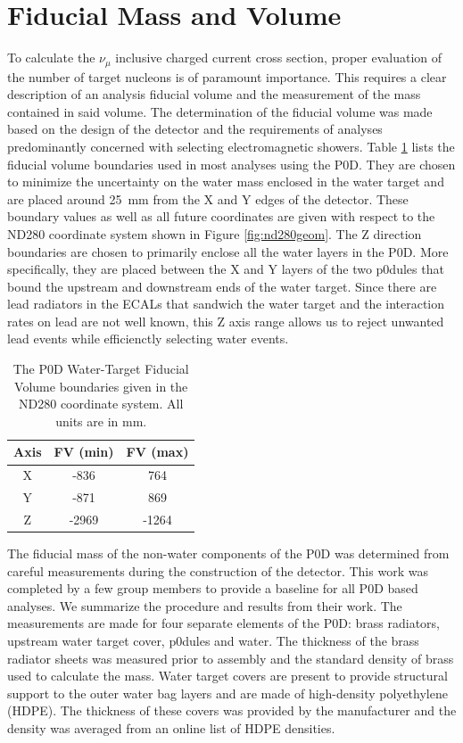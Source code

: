 \section{Fiducial Mass and Volume}
\label{sec:fidmassvol}

To calculate the $\nu_\mu$ inclusive charged current cross section, proper evaluation of the number of target nucleons is of paramount importance. This requires a clear description of an analysis fiducial volume and the measurement of the mass contained in said volume. The determination of the fiducial volume was made based on the design of the detector and the requirements of analyses predominantly concerned with selecting electromagnetic showers. Table \ref{tab:FV} lists the fiducial volume boundaries used in most analyses using the P0D. They are chosen to minimize the uncertainty on the water mass enclosed in the water target and are placed around 25~mm from the X and Y edges of the detector. These boundary values as well as all future coordinates are given with respect to the ND280 coordinate system shown in Figure \ref{fig:nd280geom}. The Z direction boundaries are chosen to primarily enclose all the water layers in the P0D. More specifically, they are placed between the X and Y layers of the two p0dules that bound the upstream and downstream ends of the water target. Since there are lead radiators in the ECALs that sandwich the water target and the interaction rates on lead are not well known, this Z axis range allows us to reject unwanted lead events while efficienctly selecting water events. 

\begin{table}[h]
\caption{The P0D Water-Target Fiducial Volume boundaries given in the ND280 coordinate system. All units are in mm.}
\centering
\begin{tabular}{ccc}
\toprule
Axis & FV (min) & FV (max) \\
\hline
X & -836 & 764 \\
Y & -871 & 869 \\
Z & -2969 & -1264 \\
\bottomrule
\end{tabular} 
\label{tab:FV} 
\end{table}

The fiducial mass of the non-water components of the P0D was determined from careful measurements during the construction of the detector. This work was completed by a few group members to provide a baseline for all P0D based analyses. We summarize the procedure and results from their work. The measurements are made for four separate elements of the P0D: brass radiators, upstream water target cover, p0dules and water. The thickness of the brass radiator sheets was measured prior to assembly and the standard density of brass used to calculate the mass. Water target covers are present to provide structural support to the outer water bag layers and are made of high-density polyethylene (HDPE). The thickness of these covers was provided by the manufacturer and the density was averaged from an online list of HDPE densities.

